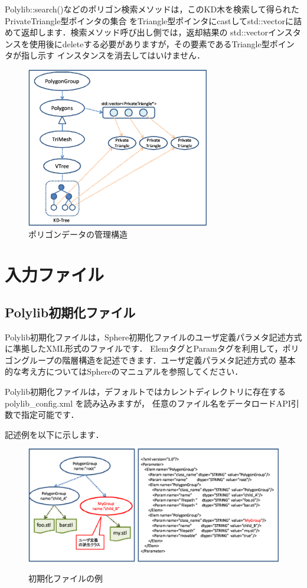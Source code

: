 {Polylib::search()などのポリゴン検索メソッドは，このKD木を検索して得られたPrivateTriangle型ポインタの集合
をTriangle型ポインタにcastしてstd::vectorに詰めて返却します．検索メソッド呼び出し側では，返却結果の
std::vectorインスタンスを使用後にdeleteする必要がありますが，その要素であるTriangle型ポインタが指し示す
インスタンスを消去してはいけません．

\begin{figure}[H]
 \centering
 \includegraphics[width=8cm]{clip002.eps}
 \caption{ポリゴンデータの管理構造}
\end{figure}


%
\section{入力ファイル}

\subsection{Polylib初期化ファイル}

Polylib初期化ファイルは，Sphere初期化ファイルのユーザ定義パラメタ記述方式に準拠したXML形式のファイルです．
ElemタグとParamタグを利用して，ポリゴングループの階層構造を記述できます．ユーザ定義パラメタ記述方式の
基本的な考え方についてはSphereのマニュアルを参照してください．

Polylib初期化ファイルは，デフォルトではカレントディレクトリに存在する polylib\_config.xml を読み込みますが，
任意のファイル名をデータロードAPI引数で指定可能です．

記述例を以下に示します．

\begin{figure}[H]
 \centering
 \includegraphics[width=16cm]{clip003.eps}\\
 \caption{初期化ファイルの例}
\end{figure}

}
